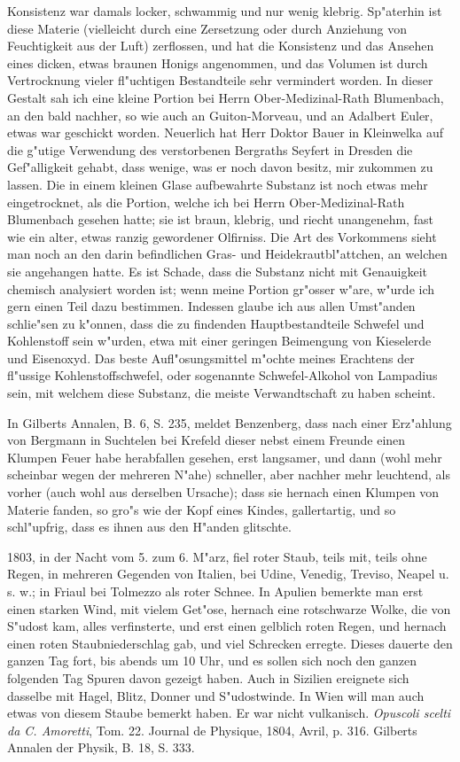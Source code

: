 \documentclass[a4paper, 11pt, oneside, polutonikogreek, german]{article}
\begin{document}
Konsistenz war damals locker, schwammig und nur wenig klebrig. Sp"aterhin ist diese Materie (vielleicht durch eine Zersetzung oder durch Anziehung von Feuchtigkeit aus der Luft) zerflossen, und hat die Konsistenz und das Ansehen eines dicken, etwas braunen Honigs angenommen, und das Volumen ist durch Vertrocknung vieler fl"uchtigen Bestandteile sehr vermindert worden. In dieser Gestalt sah ich eine kleine Portion bei Herrn Ober-Medizinal-Rath Blumenbach, an den bald nachher, so wie auch an Guiton-Morveau, und an Adalbert Euler, etwas war geschickt worden. Neuerlich hat Herr Doktor Bauer in Kleinwelka auf die g"utige Verwendung des verstorbenen Bergraths Seyfert in Dresden die Gef"alligkeit gehabt, dass wenige, was er noch davon besitz, mir zukommen zu lassen. Die in einem kleinen Glase aufbewahrte Substanz ist noch etwas mehr eingetrocknet, als die Portion, welche ich bei Herrn Ober-Medizinal-Rath Blumenbach gesehen hatte; sie ist braun, klebrig, und riecht unangenehm, fast wie ein alter, etwas ranzig gewordener Olfirniss. Die Art des Vorkommens sieht man noch an den darin befindlichen Gras- und Heidekrautbl"attchen, an welchen sie angehangen hatte. Es ist Schade, dass die Substanz nicht mit Genauigkeit chemisch analysiert worden ist; wenn meine Portion gr"osser w"are, w"urde ich gern einen Teil dazu bestimmen. Indessen glaube ich aus allen Umst"anden schlie"sen zu k"onnen, dass die zu findenden Hauptbestandteile Schwefel und Kohlenstoff sein w"urden, etwa mit einer geringen Beimengung von Kieselerde und Eisenoxyd. Das beste Aufl"osungsmittel m"ochte meines Erachtens der fl"ussige Kohlenstoffschwefel, oder sogenannte Schwefel-Alkohol von Lampadius sein, mit welchem diese Substanz, die meiste Verwandtschaft zu haben scheint.

In Gilberts Annalen, B. 6, S. 235, meldet Benzenberg, dass nach einer Erz"ahlung von Bergmann in Suchtelen bei Krefeld dieser nebst einem Freunde einen Klumpen Feuer habe herabfallen gesehen, erst langsamer, und dann (wohl mehr scheinbar wegen der mehreren N"ahe) schneller, aber nachher mehr leuchtend, als vorher (auch wohl aus derselben Ursache); dass sie hernach einen Klumpen von Materie fanden, so gro"s wie der Kopf eines Kindes, gallertartig, und so schl"upfrig, dass es ihnen aus den H"anden glitschte.

1803, in der Nacht vom 5. zum 6. M"arz, fiel roter Staub, teils mit, teils ohne Regen, in mehreren Gegenden von Italien, bei Udine, Venedig, Treviso, Neapel u. s. w.; in Friaul bei Tolmezzo als roter Schnee. In Apulien bemerkte man erst einen starken Wind, mit vielem Get"ose, hernach eine rotschwarze Wolke, die von S"udost kam, alles verfinsterte, und erst einen gelblich roten Regen, und hernach einen roten Staubniederschlag gab, und viel Schrecken erregte. Dieses dauerte den ganzen Tag fort, bis abends um 10 Uhr, und es sollen sich noch den ganzen folgenden Tag Spuren davon gezeigt haben. Auch in Sizilien ereignete sich dasselbe mit Hagel, Blitz, Donner und S"udostwinde. In Wien will man auch etwas von diesem Staube bemerkt haben. Er war nicht vulkanisch. \emph{Opuscoli scelti da C. Amoretti}, Tom. 22. Journal de Physique, 1804, Avril, p. 316. Gilberts Annalen der Physik, B. 18, S. 333.
\end{document}
